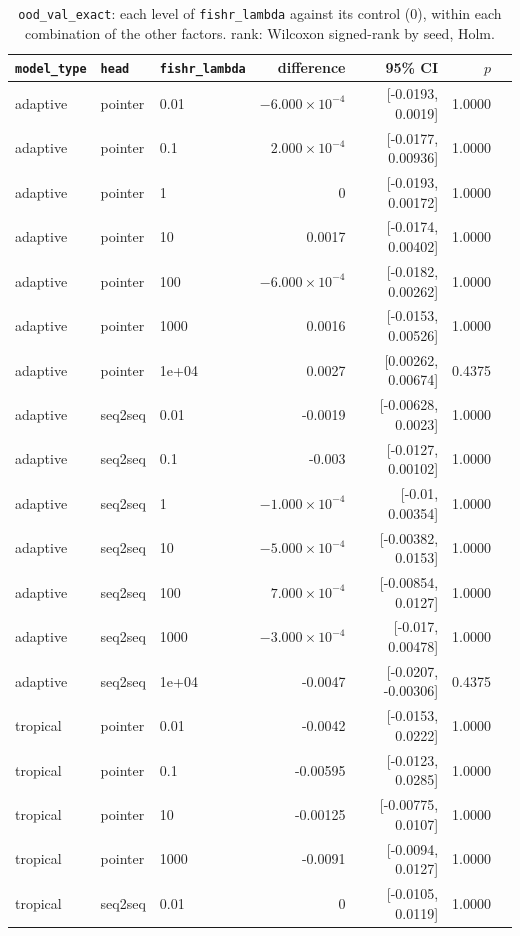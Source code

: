 \documentclass[10pt]{article}
\begin{document}
{\small
\begin{longtable}{lllrrrl}
\caption{\texttt{ood\_val\_exact}: each level of \texttt{fishr\_lambda} against its control (0), within each combination of the other factors. rank: Wilcoxon signed-rank by seed, Holm.}\label{tab:control-ood_val_exact}\\
\toprule
\texttt{model\_type} & \texttt{head} & \texttt{fishr\_lambda} & difference & 95\% CI & $p$ & \\
\midrule
\endhead
adaptive & pointer & 0.01 & $-6.000\times10^{-4}$ & [-0.0193, 0.0019] & 1.0000 & \\
adaptive & pointer & 0.1 & $2.000\times10^{-4}$ & [-0.0177, 0.00936] & 1.0000 & \\
adaptive & pointer & 1 & 0 & [-0.0193, 0.00172] & 1.0000 & \\
adaptive & pointer & 10 & 0.0017 & [-0.0174, 0.00402] & 1.0000 & \\
adaptive & pointer & 100 & $-6.000\times10^{-4}$ & [-0.0182, 0.00262] & 1.0000 & \\
adaptive & pointer & 1000 & 0.0016 & [-0.0153, 0.00526] & 1.0000 & \\
adaptive & pointer & 1e+04 & 0.0027 & [0.00262, 0.00674] & 0.4375 & \\
adaptive & seq2seq & 0.01 & -0.0019 & [-0.00628, 0.0023] & 1.0000 & \\
adaptive & seq2seq & 0.1 & -0.003 & [-0.0127, 0.00102] & 1.0000 & \\
adaptive & seq2seq & 1 & $-1.000\times10^{-4}$ & [-0.01, 0.00354] & 1.0000 & \\
adaptive & seq2seq & 10 & $-5.000\times10^{-4}$ & [-0.00382, 0.0153] & 1.0000 & \\
adaptive & seq2seq & 100 & $7.000\times10^{-4}$ & [-0.00854, 0.0127] & 1.0000 & \\
adaptive & seq2seq & 1000 & $-3.000\times10^{-4}$ & [-0.017, 0.00478] & 1.0000 & \\
adaptive & seq2seq & 1e+04 & -0.0047 & [-0.0207, -0.00306] & 0.4375 & \\
tropical & pointer & 0.01 & -0.0042 & [-0.0153, 0.0222] & 1.0000 & \\
tropical & pointer & 0.1 & -0.00595 & [-0.0123, 0.0285] & 1.0000 & \\
tropical & pointer & 10 & -0.00125 & [-0.00775, 0.0107] & 1.0000 & \\
tropical & pointer & 1000 & -0.0091 & [-0.0094, 0.0127] & 1.0000 & \\
tropical & seq2seq & 0.01 & 0 & [-0.0105, 0.0119] & 1.0000 & \\

\end{longtable}}
\end{document}

